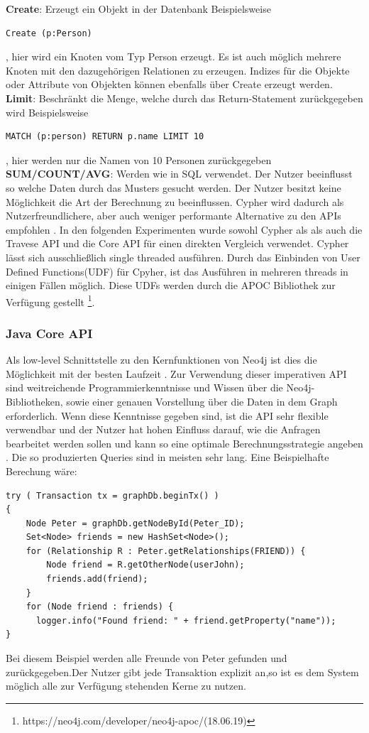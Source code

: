 \textbf{Create}: Erzeugt ein Objekt in der Datenbank Beispielsweise 
\begin{Verbatim}[frame=single]
Create (p:Person)
\end{Verbatim}
, hier wird ein Knoten vom Typ Person erzeugt. Es ist auch möglich mehrere Knoten mit den dazugehörigen Relationen zu erzeugen. Indizes  für die Objekte oder Attribute von Objekten können ebenfalls über Create erzeugt werden.\newline
\textbf{Limit}: Beschränkt die Menge, welche durch das Return-Statement zurückgegeben wird Beispielsweise
\begin{Verbatim}[frame=single]
MATCH (p:person) RETURN p.name LIMIT 10
\end{Verbatim} 
, hier werden nur die Namen  von 10 Personen zurückgegeben\newline
\textbf{SUM/COUNT/AVG}: Werden wie in SQL verwendet. \newline
Der Nutzer beeinflusst so welche Daten durch  das Musters gesucht werden. Der Nutzer besitzt keine Möglichkeit die Art der Berechnung zu beeinflussen. Cypher wird dadurch als Nutzerfreundlichere, aber auch weniger performante Alternative zu den APIs empfohlen \parencite{vukotic2015neo4j}. In den folgenden Experimenten wurde sowohl Cypher als als auch die Travese API und die Core API für einen direkten Vergleich verwendet. Cypher lässt sich ausschließlich  single threaded ausführen. Durch das Einbinden von User Defined Functions(UDF) für Cpyher, ist das Ausführen in mehreren threads in einigen Fällen möglich. Diese UDFs werden durch die APOC Bibliothek zur Verfügung gestellt \footnote{https://neo4j.com/developer/neo4j-apoc/(18.06.19)}.

\subsubsection{Java Core API}
Als low-level Schnittstelle zu den Kernfunktionen von Neo4j ist dies die Möglichkeit mit der besten Laufzeit \parencite{vukotic2015neo4j}. Zur Verwendung dieser imperativen API sind weitreichende Programmierkenntnisse und Wissen über die Neo4j-Bibliotheken, sowie einer genauen Vorstellung über die Daten in dem Graph erforderlich. Wenn diese Kenntnisse gegeben sind, ist die API sehr flexible verwendbar  und der Nutzer hat hohen Einfluss darauf, wie die Anfragen bearbeitet werden sollen und kann so eine optimale Berechnungsstrategie angeben \parencite{vukotic2015neo4j}. Die so produzierten Queries sind in meisten sehr lang. Eine Beispielhafte Berechung wäre:
\begin{Verbatim}[frame=single]
try ( Transaction tx = graphDb.beginTx() )
{
	Node Peter = graphDb.getNodeById(Peter_ID);
	Set<Node> friends = new HashSet<Node>();
	for (Relationship R : Peter.getRelationships(FRIEND)) {  
		Node friend = R.getOtherNode(userJohn);
		friends.add(friend);                        
	}
	for (Node friend : friends) {
	  logger.info("Found friend: " + friend.getProperty("name")); 
}

\end{Verbatim}
Bei diesem Beispiel werden alle Freunde von Peter gefunden und zurückgegeben.Der Nutzer gibt jede Transaktion explizit an,so ist es dem System möglich alle zur Verfügung stehenden Kerne zu nutzen.

